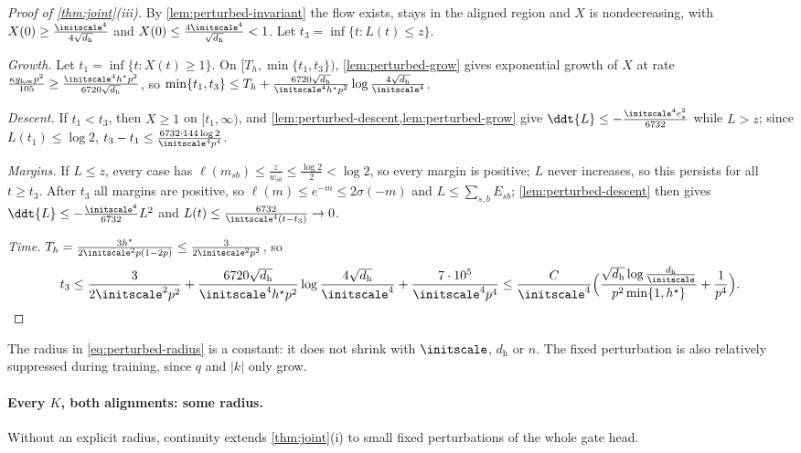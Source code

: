 \begin{proof}[Proof of \cref{thm:joint}(iii)]
By \cref{lem:perturbed-invariant} the flow exists, stays in the aligned region and $X$ is nondecreasing, with
$X(0)\ge\frac{\initscale^4}{4\sqrt{d_{\mathrm h}}}$ and $X(0)\le\frac{4\initscale^4}{\sqrt{d_{\mathrm h}}}<1$. Let $t_3=\inf\{t:L(t)\le z\}$.

\emph{Growth.} Let $t_1=\inf\{t:X(t)\ge1\}$. On $[T_h,\min\{t_1,t_3\})$, \cref{lem:perturbed-grow} gives exponential growth of $X$ at rate
$\frac{\kappa g_{\mathrm{low}}p^2}{105}\ge\frac{\initscale^4h^\star p^2}{6720\sqrt{d_{\mathrm h}}}$, so
$\min\{t_1,t_3\}\le T_h+\frac{6720\sqrt{d_{\mathrm h}}}{\initscale^4h^\star p^2}\log\frac{4\sqrt{d_{\mathrm h}}}{\initscale^4}$.

\emph{Descent.} If $t_1<t_3$, then $X\ge1$ on $[t_1,\infty)$, and \cref{lem:perturbed-descent,lem:perturbed-grow} give
$\ddt{L}\le-\frac{\initscale^4e_\ast^2}{6732}$ while $L>z$; since $L(t_1)\le\log2$, $t_3-t_1\le\frac{6732\cdot144\log2}{\initscale^4p^4}$.

\emph{Margins.} If $L\le z$, every case has $\ell(m_{sb})\le\frac{z}{w_{sb}}\le\frac{\log2}2<\log2$, so every margin is positive; $L$ never increases,
so this persists for all $t\ge t_3$. After $t_3$ all margins are positive, so $\ell(m)\le e^{-m}\le2\sigma(-m)$ and $L\le\sum_{s,b}E_{sb}$;
\cref{lem:perturbed-descent} then gives $\ddt{L}\le-\frac{\initscale^4}{6732}L^2$ and $L(t)\le\frac{6732}{\initscale^4(t-t_3)}\to0$.

\emph{Time.} $T_h=\frac{3h^\star}{2\initscale^2p(1-2p)}\le\frac{3}{2\initscale^2p^2}$, so
\[
 t_3\le\frac{3}{2\initscale^2p^2}+\frac{6720\sqrt{d_{\mathrm h}}}{\initscale^4h^\star p^2}\log\frac{4\sqrt{d_{\mathrm h}}}{\initscale^4}+\frac{7\cdot10^5}{\initscale^4p^4}
 \le\frac{C}{\initscale^4}\Bigl(\frac{\sqrt{d_{\mathrm h}}\log\frac{d_{\mathrm h}}{\initscale}}{p^2\min\{1,h^\star\}}+\frac1{p^4}\Bigr).\qedhere
\]
\end{proof}

The radius in \cref{eq:perturbed-radius} is a constant: it does not shrink with $\initscale$, $d_{\mathrm h}$ or $n$. The fixed perturbation is also
relatively suppressed during training, since $q$ and $|k|$ only grow.

\paragraph{Every $K$, both alignments: some radius.} Without an explicit radius, continuity extends \cref{thm:joint}(i) to small fixed perturbations
of the whole gate head.

